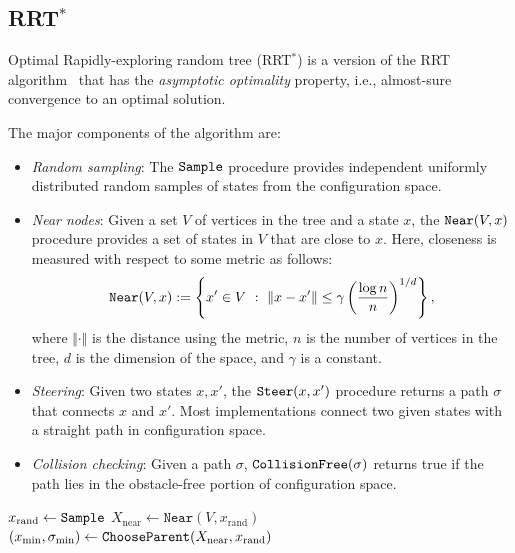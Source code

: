 \documentclass[letterpaper, 10pt, english, conference]{IEEEtran}
\begin{document}
\subsection{RRT$^*$}

Optimal Rapidly-exploring random tree (RRT$^*$) \cite{karaman.frazzoli.ijrr11} is a version of the RRT algorithm~\cite{lavalle.kuffner.ijrr01} that has the \emph{asymptotic optimality} property, i.e., almost-sure convergence to an optimal solution.

The major components of the algorithm are:
\begin{itemize}
\item {\it Random sampling}:
%
The ${\tt Sample}$ procedure provides independent uniformly distributed random samples of states from the configuration space.

\item {\it Near nodes}:
%
Given a set $V$ of vertices in the tree and a state $x$, the ${\tt
Near}(V, x)$ procedure provides a set of states in $V$ that are close to
$x$. Here, closeness is measured with respect to some metric as
follows:
$$
{\tt Near}(V, x) := \left\{ x' \in V \,\,:\,\, \Vert x - x' \Vert \le \gamma
\left(\frac{\log n}{n}\right)^{1/d} \right\},
$$
where $\Vert \cdot \Vert$ is the distance using the metric, $n$ is the number of vertices in the tree, $d$ is the dimension of the space, and $\gamma$ is a constant.
 
\item {\it Steering}:
%
Given two states $x, x'$, the ${\tt Steer}(x,x')$ procedure returns a path $\sigma$ that connects $x$ and $x'$. Most implementations connect two given states with a straight path in configuration space.

\item {\it Collision checking}:
%
Given a path $\sigma$, ${\tt CollisionFree}(\sigma)$ returns true if the path lies in the obstacle-free portion of configuration space.

\end{itemize}

\begin{center}
\begin{algorithm}
 { \label{line:iteration_start_orig}
$x_\mathrm{rand} \leftarrow {\tt Sample}$\; \label{line:rrtstar:sample}
$X_\mathrm{near} \leftarrow \mathtt{Near}(V ,x_\mathrm{rand})$\; \label{line:rrtstar:compute_near_orig}
$(x_\mathrm{min},\sigma_\mathrm{min}) \leftarrow {\tt ChooseParent}(X_\mathrm{near}, x_\mathrm{rand})$\; \label{line:rrtstar:call_find_min_cost_parent}
}
\;
\caption{${\tt RRT}^* ((V,E), N)$}
\label{algorithm:rrtstar_orig}
\end{algorithm}
\end{center}
\end{document}
